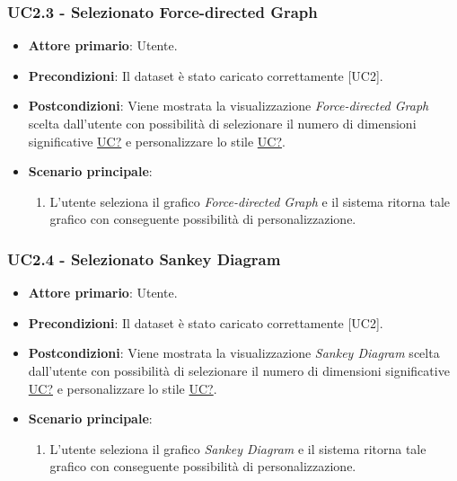 \subsubsection{UC2.3 - Selezionato Force-directed Graph}
\label{sec:UC2.3}
\begin{itemize}
    \item \textbf{Attore primario}: Utente.
    \item \textbf{Precondizioni}: Il dataset è stato caricato correttamente [UC2].
    \item \textbf{Postcondizioni}: Viene mostrata la visualizzazione \textit{Force-directed Graph} scelta dall'utente con possibilità di selezionare il numero di dimensioni significative \hyperref[sec:UC2]{UC?} e personalizzare lo stile \hyperref[sec:UC2]{UC?}. %
    \item \textbf{Scenario principale}:
          \begin{enumerate}
              \item L'utente seleziona il grafico \textit{Force-directed Graph} e il sistema ritorna tale grafico con conseguente possibilità di personalizzazione. 
          \end{enumerate}
\end{itemize}

\subsubsection{UC2.4 - Selezionato Sankey Diagram}
\label{sec:UC2.4}
\begin{itemize}
    \item \textbf{Attore primario}: Utente.
    \item \textbf{Precondizioni}: Il dataset è stato caricato correttamente [UC2].
    \item \textbf{Postcondizioni}: Viene mostrata la visualizzazione \textit{Sankey Diagram} scelta dall'utente con possibilità di selezionare il numero di dimensioni significative \hyperref[sec:UC2]{UC?} e personalizzare lo stile \hyperref[sec:UC2]{UC?}. %
    \item \textbf{Scenario principale}:
          \begin{enumerate}
              \item L'utente seleziona il grafico \textit{Sankey Diagram} e il sistema ritorna tale grafico con conseguente possibilità di personalizzazione. 
          \end{enumerate}
\end{itemize}

